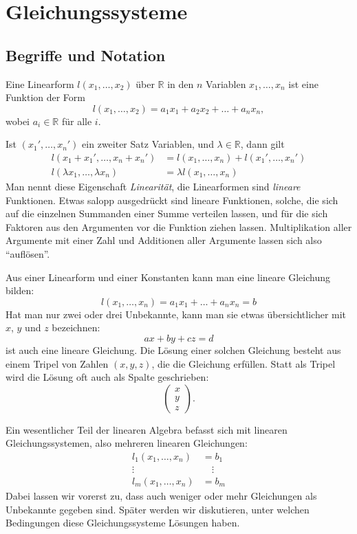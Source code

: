 %
%
%
\section{Gleichungssysteme}
\subsection{Begriffe und Notation}
\begin{definition}
Eine Linearform $l(x_1,\dots,x_2)$ über $\mathbb R$ in den $n$
Variablen $x_1,\dots,x_n$
ist eine Funktion der Form
\[
l(x_1,\dots,x_2)=a_1x_1+a_2x_2+\dots+a_nx_n,
\]
wobei $a_i\in\mathbb R$ für alle $i$.
\end{definition}
Ist $(x_1',\dots,x_n')$ ein zweiter Satz Variablen, und $\lambda\in\mathbb R$,
dann gilt
\begin{equation}
\begin{aligned}
l(x_1+x_1',\dots,x_n+x_n')&=l(x_1,\dots, x_n)+l(x_1',\dots,x_n')\\
l(\lambda x_1, \dots ,\lambda x_n)&=\lambda l(x_1,\dots,x_n)
\end{aligned}
\label{linearitaet-linearformen}
\end{equation}
Man nennt diese Eigenschaft {\em Linearität}, die Linearformen sind
{\em lineare} Funktionen.
%
Etwas salopp ausgedrückt sind lineare Funktionen, solche, die sich
auf die einzelnen Summanden einer Summe verteilen lassen, und für
die sich Faktoren aus den Argumenten vor die Funktion ziehen lassen.
Multiplikation aller Argumente mit einer Zahl und Additionen aller
Argumente lassen sich also ``auflösen''.

Aus einer Linearform und einer Konstanten kann man eine
lineare Gleichung bilden:
\[
l(x_1,\dots,x_n)=a_1x_1+\dots +a_nx_n=b
\]
Hat man nur zwei oder drei Unbekannte, kann man sie etwas übersichtlicher
mit $x$, $y$ und $z$ bezeichnen:
\[
ax+by+cz=d
\]
ist auch eine lineare Gleichung.
Die Lösung einer solchen Gleichung
besteht aus einem Tripel von Zahlen $(x,y,z)$, die die Gleichung erfüllen.
Statt als Tripel wird die Lösung oft auch als Spalte geschrieben:
\[
\begin{pmatrix}
x\\y\\z
\end{pmatrix}.
\]

Ein wesentlicher Teil der linearen Algebra befasst sich mit linearen
Gleichungssystemen, also mehreren linearen Gleichungen:
\begin{align*}
l_1(x_1,\dots,x_n)&=b_1\\
\vdots\qquad\qquad&\quad\vdots\\
l_m(x_1,\dots,x_n)&=b_m
\end{align*}
Dabei lassen wir vorerst zu, dass auch weniger oder mehr Gleichungen
als Unbekannte gegeben sind.
Später werden wir diskutieren, unter
welchen Bedingungen diese Gleichungssysteme Lösungen haben.

